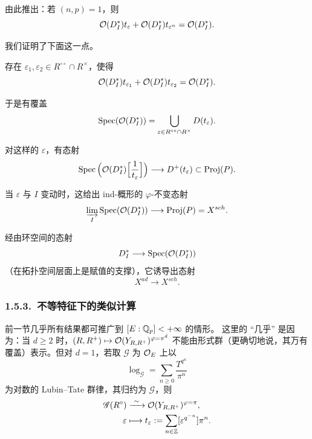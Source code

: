 \leavevmode{}由此推出：若 $(n,p)=1$，则
\[
\mathcal{O}(D^*_I)t_\varepsilon+\mathcal{O}(D^*_I)t_{\varepsilon^n}=\mathcal{O}(D^*_I).
\]

我们证明了下面这一点。

\begin{proposition}\label{prop:1.26}
存在 $\varepsilon_1,\varepsilon_2\in R^{\circ\circ}\cap R^\times$，使得
\[
\mathcal{O}(D^*_I)t_{\varepsilon_1}+\mathcal{O}(D^*_I)t_{\varepsilon_2}=\mathcal{O}(D^*_I).
\]
\end{proposition}

于是有覆盖
\[
\operatorname{Spec}(\mathcal{O}(D^*_I))=\bigcup_{\varepsilon\in R^{\circ\circ}\cap R^\times}D(t_\varepsilon).
\]

对这样的 $\varepsilon$，有态射
\[
\operatorname{Spec}\Big(\mathcal{O}(D^*_I)\Big[\frac{1}{t_\varepsilon}\Big]\Big)\longrightarrow D^+(t_\varepsilon)\subset\operatorname{Proj}(P).
\]

当 $\varepsilon$ 与 $I$ 变动时，这给出 ind-概形的 $\varphi$-不变态射
\[
\varinjlim_{I}\operatorname{Spec}(\mathcal{O}(D^*_I))\longrightarrow\operatorname{Proj}(P)=X^{sch}.
\]

经由环空间的态射
\[
D^*_I\longrightarrow\operatorname{Spec}(\mathcal{O}(D^*_I))
\]
（在拓扑空间层面上是赋值的支撑），它诱导出态射
\[
X^{ad}\longrightarrow X^{sch}.
\]

\subsubsection*{1.5.3.\ 不等特征下的类似计算}

前一节几乎所有结果都可推广到 $[E:\mathbb{Q}_p]<+\infty$ 的情形。
这里的 “几乎” 是因为：当 $d\ge2$ 时，$(R,R^+)\mapsto\mathcal{O}(Y_{R,R^+})^{\varphi=\pi^d}$ 不能由形式群（更确切地说，其万有覆盖）表示。但对 $d=1$，若取 $\mathscr{G}$ 为 $\mathcal{O}_E$ 上以
\[
\log_{\mathscr{G}}=\sum_{n\ge0}\frac{T^{q^n}}{\pi^n}
\]
为对数的 Lubin–Tate 群律，其归约为 $\mathscr{G}$，则
\[
\begin{aligned}
\mathscr{G}(R^\circ)&\xrightarrow{\ \sim\ }\oo(Y_{R,R^+})^{\varphi=\pi},\\
\varepsilon&\longmapsto t_\varepsilon:=\sum_{n\in\ZZ}[\varepsilon^{q^{-n}}]\pi^n .
\end{aligned}
\]

